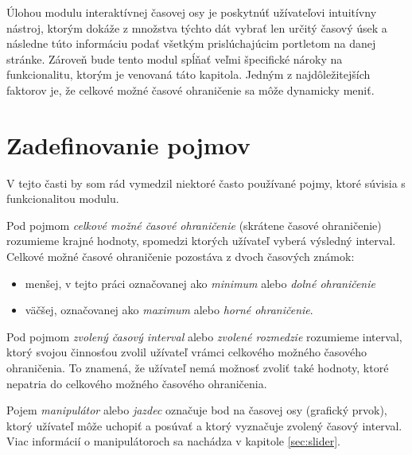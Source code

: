 \documentclass[
  digital, %
  twoside, %
  notable,   %
  nolof,   %
  nolot,   %
]{fithesis3}
\begin{document}
Úlohou modulu interaktívnej časovej osy je poskytnúť užívateľovi intuitívny nástroj, ktorým dokáže z množstva týchto dát vybrať len určitý časový úsek a následne túto informáciu podať všetkým prislúchajúcim portletom na danej stránke. Zároveň bude tento modul spĺňať veľmi špecifické nároky na funkcionalitu, ktorým je venovaná táto kapitola. Jedným z najdôležitejších faktorov je, že celkové možné časové ohraničenie sa môže dynamicky meniť.

\section{Zadefinovanie pojmov}
V tejto časti by som rád vymedzil niektoré často používané pojmy, ktoré súvisia s funkcionalitou modulu.

Pod pojmom \textit{celkové možné časové ohraničenie} (skrátene časové ohraničenie) rozumieme krajné hodnoty, spomedzi ktorých užívateľ vyberá výsledný interval. Celkové možné časové ohraničenie pozostáva z dvoch časových známok:
\begin{itemize}
\item menšej, v tejto práci označovanej ako \textit{minimum} alebo \textit{dolné ohraničenie}
\item väčšej, označovanej ako \textit{maximum} alebo \textit{horné ohraničenie}.
\end{itemize}

Pod pojmom \textit{zvolený časový interval} alebo \textit{zvolené rozmedzie} ro\-zu\-mie\-me interval, ktorý svojou činnosťou zvolil užívateľ vrámci celkového možného časového ohraničenia. To znamená, že užívateľ nemá možnosť zvoliť také hodnoty, ktoré nepatria do celkového možného časového ohraničenia.

Pojem \textit{manipulátor} alebo \textit{jazdec} označuje bod na časovej osy (grafický prvok), ktorý užívateľ môže uchopiť a posúvať a ktorý vyznačuje zvolený časový interval. Viac informácií o manipulátoroch sa nachádza v kapitole \ref{sec:slider}.
\end{document}
